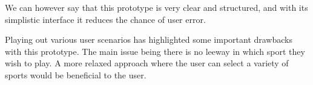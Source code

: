 We can however say that this prototype is very clear and structured, and with
its simplistic interface it reduces the chance of user error.

Playing out various user scenarios has highlighted some important drawbacks
with this prototype. The main issue being there is no leeway in which sport
they wish to play. A more relaxed approach where the user can select a variety
of sports would be beneficial to the user.

\restoregeometry%
